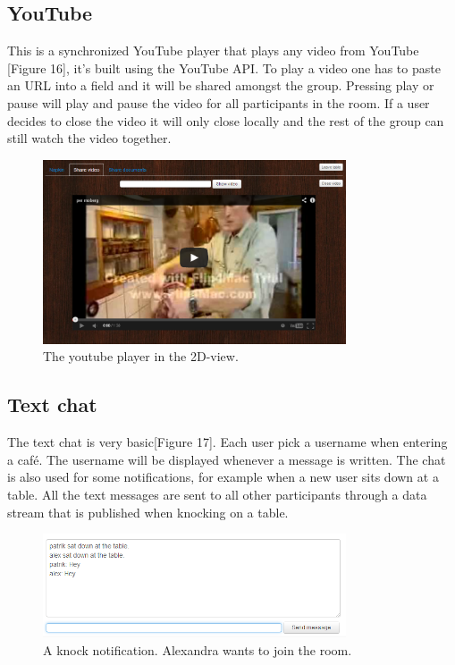 \documentclass[12pt, titlepage]{article}
\begin{document}
\subsection{YouTube}
This is a synchronized YouTube player that plays any video from YouTube [Figure 16], it's built using the YouTube API. To play a video one has to paste an URL into a field and it will be shared amongst the group. Pressing play or pause will play and pause the video for all participants in the room. If a user decides to close the video it will only close locally and the rest of the group can still watch the video together.
\begin{figure}[H]
  \centering
	\includegraphics[width=0.8\textwidth,keepaspectratio]{youtubeToReport.png}
  \caption{The youtube player in the 2D-view.}
\end{figure}
\subsection{Text chat}
The text chat is very basic[Figure 17]. Each user pick a username when entering a café. The username will be displayed whenever a message is written. The chat is also used for some notifications, for example when a new user sits down at a table. All the text messages are sent to all other participants through a data stream that is published when knocking on a table.
\begin{figure}[H]
  \centering
	\includegraphics[width=0.8\textwidth,keepaspectratio]{chat.png}
  \caption{A knock notification. Alexandra wants to join the room.}
\end{figure}
\end{document}
